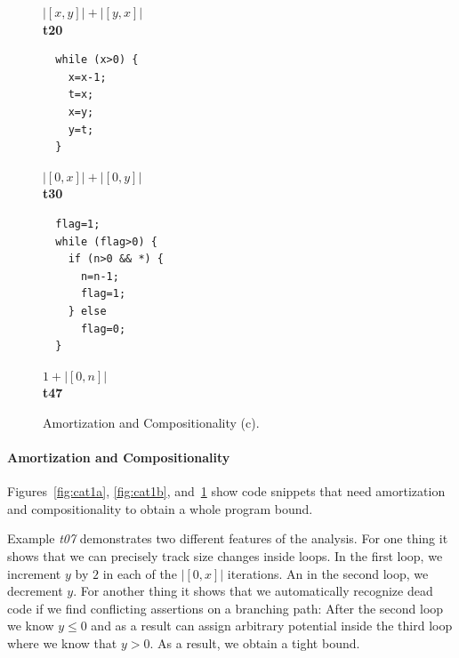 \documentclass{sigplanconf}
\begin{document}
{\begin{figure}
\begin{minipage}[b]{\progwidth}
\begin{center}
$|[x,y]|+|[y,x]|$
\\[.7\baselineskip]
      {\bf t20}
    \end{center}
  \end{minipage}%
%
%
  \begin{minipage}[b]{\progwidth}
    \begin{center}
   \begin{lstlisting}
  while (x>0) {
    x=x-1;
    t=x;
    x=y;
    y=t;
  }
   \end{lstlisting}

$|[0,x]|+|[0,y]|$
\\[.7\baselineskip]
      {\bf t30}
    \end{center}
  \end{minipage}
%
%
  \begin{minipage}[b]{\progwidth}
    \begin{center}
   \begin{lstlisting}
  flag=1;
  while (flag>0) {
    if (n>0 && *) {
      n=n-1;
      flag=1;
    } else
      flag=0;
  }
   \end{lstlisting}

$1 + |[0, n]|$
\\[.7\baselineskip]
      {\bf t47}
    \end{center}
  \end{minipage}

   \caption{Amortization and Compositionality (c).}
  \label{fig:cat1c}
\end{figure}

\paragraph{Amortization and Compositionality}

Figures~\ref{fig:cat1a}, \ref{fig:cat1b}, and~\ref{fig:cat1c} show
code snippets that need amortization and compositionality to obtain a
whole program bound.

Example \emph{t07} demonstrates two different features of the
analysis.  For one thing it shows that we can precisely track size
changes inside loops.  In the first loop, we increment $y$ by $2$ in
each of the $|[0,x]|$ iterations.  An in the second loop, we decrement
$y$.  For another thing it shows that we automatically recognize dead
code if we find conflicting assertions on a branching path: After the
second loop we know $y \leq 0$ and as a result can assign arbitrary
potential inside the third loop where we know that $y>0$.  As a
result, we obtain a tight bound.

}
\end{document}
